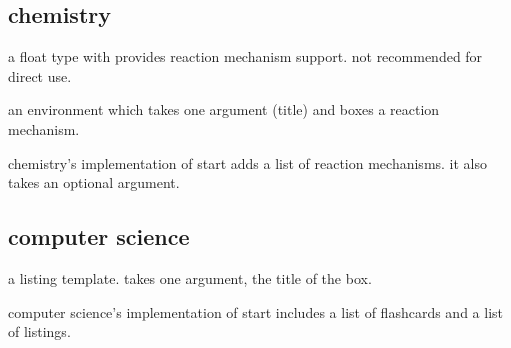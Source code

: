 \documentclass[lowerhead,12pt]{aesthetic}
\begin{document}
\subsection{chemistry}\label{subsec:chem}
\begin{description}[font=\ttfamily]
  \item[mechanism] a float type with provides reaction mechanism support. not recommended for direct use.

  \item[mech] an environment which takes one argument (title) and boxes a reaction mechanism.

  \item[start] chemistry's implementation of start adds a list of reaction mechanisms. it also takes an optional argument.
\end{description}

\subsection{computer science}\label{subsec:cse}
\begin{description}[font=\ttfamily]
  \item[code] a listing template. takes one argument, the title of the box.

  \item[start] computer science's implementation of start includes a list of flashcards and a list of listings.
\end{description}
\end{document}

